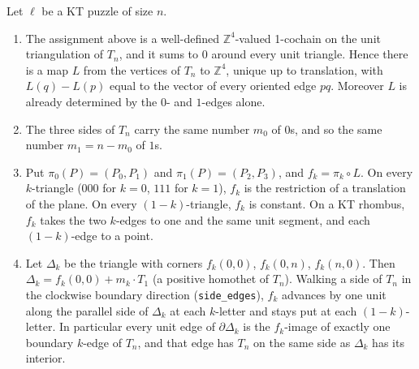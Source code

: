 \documentclass[11pt]{article}
\theoremstyle{definition}\newtheorem{definition}[theorem]{Definition}\newtheorem{remark}[theorem]{Remark}
\newcommand{\Z}{\mathbb Z}\newcommand{\R}{\mathbb R}
\begin{document}
\begin{lemma}\label{lem:D}
Let $\ell$ be a KT puzzle of size $n$.
\begin{enumerate}
\item The assignment above is a well-defined $\Z^4$-valued 1-cochain on the unit triangulation of $T_n$, and it sums to $0$ around every unit triangle. Hence there is a map $L$ from the vertices of $T_n$ to $\Z^4$, unique up to translation, with $L(q)-L(p)$ equal to the vector of every oriented edge $pq$. Moreover $L$ is already determined by the $0$- and $1$-edges alone.
\item The three sides of $T_n$ carry the same number $m_0$ of $0$s, and so the same number $m_1=n-m_0$ of $1$s.
\item Put $\pi_0(P)=(P_0,P_1)$ and $\pi_1(P)=(P_2,P_3)$, and $f_k=\pi_k\circ L$. On every $k$-triangle ($000$ for $k=0$, $111$ for $k=1$), $f_k$ is the restriction of a translation of the plane. On every $(1-k)$-triangle, $f_k$ is constant. On a KT rhombus, $f_k$ takes the two $k$-edges to one and the same unit segment, and each $(1-k)$-edge to a point.
\item Let $\Delta_k$ be the triangle with corners $f_k(0,0)$, $f_k(0,n)$, $f_k(n,0)$. Then $\Delta_k=f_k(0,0)+m_k\cdot T_1$ (a positive homothet of $T_n$). Walking a side of $T_n$ in the clockwise boundary direction (\texttt{side\_edges}), $f_k$ advances by one unit along the parallel side of $\Delta_k$ at each $k$-letter and stays put at each $(1-k)$-letter. In particular every unit edge of $\partial\Delta_k$ is the $f_k$-image of exactly one boundary $k$-edge of $T_n$, and that edge has $T_n$ on the same side as $\Delta_k$ has its interior.
\end{enumerate}
\end{lemma}
\end{document}
